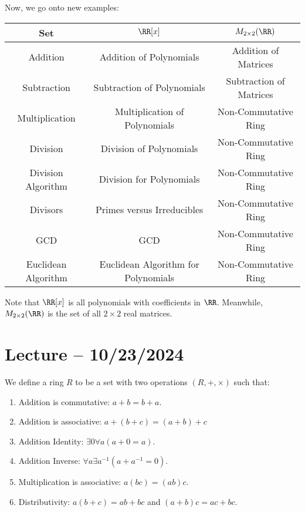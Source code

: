 \documentclass[openany]{book}
\begin{document}
Now, we go onto new examples:
\begin{center}
	\begin{tabular}{c|c|c}
		Set & $\RR[x]$ & $M_{2 \times 2}(\RR)$ \\
		\hline
		Addition & Addition of Polynomials & Addition of Matrices\\
		Subtraction & Subtraction of Polynomials & Subtraction of Matrices \\
		\hline
		Multiplication & Multiplication of Polynomials & Non-Commutative Ring \\
		Division & Division of Polynomials & Non-Commutative Ring\\
		\hline
		Division Algorithm & Division for Polynomials & Non-Commutative Ring \\
		\hline
		Divisors & Primes versus Irreducibles & Non-Commutative Ring\\
		\hline
		GCD & GCD & Non-Commutative Ring \\
		\hline
		Euclidean Algorithm & Euclidean Algorithm for Polynomials & Non-Commutative Ring
	\end{tabular}
\end{center}

\begin{rmk}
	Note that $\RR[x]$ is all polynomials with coefficients in $\RR$. Meanwhile, $M_{2 \times 2}(\RR)$ is the set of all $2\times 2$ real matrices.
\end{rmk}

\section{Lecture -- 10/23/2024}
\begin{defn}[Ring]
	We define a ring $R$ to be a set with two operations $(R, +, \times)$ such that:
	\begin{enumerate}
		\item Addition is commutative: $a+b=b+a$.
		\item Addition is associative: $a+(b+c) = (a+b)+c$
		\item Addition Identity: $\exists 0\forall a(a + 0 = a)$.
		\item Addition Inverse: $\forall a\exists a^{-1}(a + a^{-1} = 0)$. 
		\item Multiplication is associative: $a(bc) = (ab)c$.
		\item Distributivity: $a(b+c) = ab + bc$ and $(a+b)c = ac + bc$.
	\end{enumerate}
\end{defn}
\end{document}
